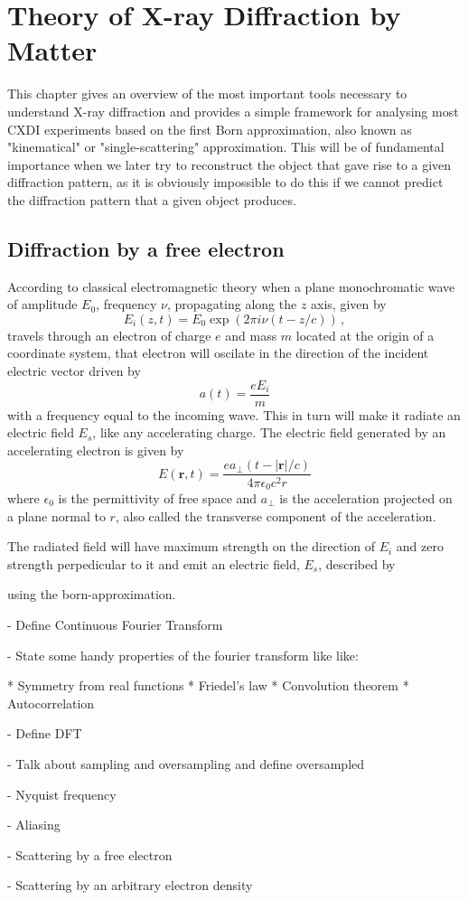 \chapter{Theory of X-ray Diffraction by Matter}\label{diffraction_theory}\noindent

This chapter gives an overview of the most important tools necessary to
understand X-ray diffraction and provides a simple framework for analysing most
CXDI experiments based on the first Born approximation, also known as
"kinematical" or "single-scattering" approximation. This will be of fundamental
importance when we later try to reconstruct the object that gave rise to a given
diffraction pattern, as  it is obviously impossible to do this if we cannot
predict the diffraction pattern that a given object produces.

\section{Diffraction by a free electron}\label{diffraction_physics}

According to classical electromagnetic theory when a plane monochromatic wave of
amplitude $E_0$, frequency $\nu$, propagating along the $z$ axis, given by
\begin{equation}
E_i(z,t) = E_0 \exp(2 \pi i \nu (t-z/c)) \, ,
\end{equation}
travels through an electron of charge $e$ and mass $m$ located at the origin of a coordinate
system, that electron will oscilate in the direction of the incident electric 
vector driven by
\begin{equation}
a(t) = \frac{e E_i}{m}
\end{equation}
with a frequency equal to the incoming wave. This in turn will make it radiate
an electric field $E_s$, like any accelerating charge. The electric field
generated by an accelerating electron is given by
\begin{equation}
E( \mathbf r,t) = \frac{e a_{\perp}(t - |\mathbf r|/c)}{4 \pi \epsilon_0 c^2 r}
\end{equation}
where  $\epsilon_0$ is the permittivity of free space and $a_{\perp}$ is the
acceleration projected on a plane normal to $r$, also called the transverse
component of the acceleration.

The radiated field will
have maximum strength on the direction of $E_i$ and zero strength perpedicular
to it
and emit an electric field, $E_s$, described by


using the born-approximation.

- Define Continuous Fourier Transform 

- State some handy properties of the fourier transform like like:

* Symmetry from real functions
* Friedel's law 
* Convolution theorem
* Autocorrelation

- Define DFT

- Talk about sampling and oversampling and define oversampled

- Nyquist frequency

- Aliasing

- Scattering by a free electron

- Scattering by an arbitrary electron density
